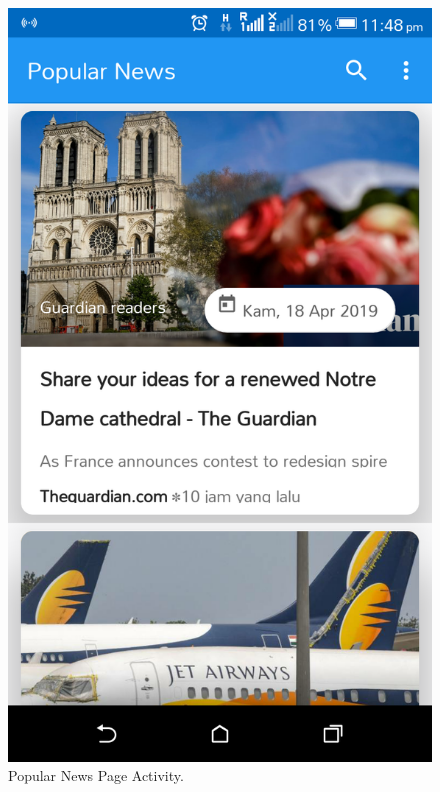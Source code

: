 \begin{appendices}
\begin{figure}[!ht]
	\centering
	\includegraphics[scale=0.2]{news-home.png}
	\caption{\label{img21}  Popular News Page Activity.}
\end{figure}


\end{appendices}
